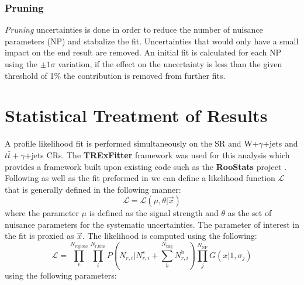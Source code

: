 \subsubsection{Pruning}
\textit{Pruning} uncertainties is done in order to reduce the number of nuisance parameters (NP) and stabalize the fit.  Uncertainties that would only have a small impact on the end result are removed.  An initial fit is calculated for each NP using the $\pm 1 \sigma$ variation, if the effect on the uncertainty is less than the given threshold of 1\% the contribution is removed from further fits. %

\section{Statistical Treatment of Results}
A profile likelihood fit is performed simultaneously on the SR and W+$\gamma$+jets and $t\bar{t} +\gamma$+jets CRs.  The \textbf{TRExFitter} framework \cite{TRExFitter} was used for this analysis which provides a framework built upon existing code such as the \textbf{RooStats} project \cite{Moneta:2010pm}.
Following \cite{Lista:2016chp} as well as the fit preformed in \cite{GregorFCNC} we can define a likelihood function $\mathcal{L}$ that is generally defined in the following manner:
\[ \mathcal{L} = \mathcal{L}(\mu,\theta|\overrightarrow{x})
\]
where the parameter $\mu$ is defined as the signal strength and $\theta$ as the set of nuisance parameters for the systematic uncertainties.  The parameter of interest in the fit is proxied as  $\overrightarrow{x}$.  The likelihood is computed using the following:
\[ \mathcal{L} = \displaystyle\prod_{r}^{N_\text{regions}}  \displaystyle\prod_{i}^{N_\text{r,bins}} P(N_{r,i}|N_{r,i}^\text{s} + \displaystyle\sum_{b}^{N_\text{bkg}}N_{r,i}^\text{b}) \displaystyle\prod_{j}^{N_\text{NP}} G(x|1,\sigma_{j})
\]
using the following parameters:
